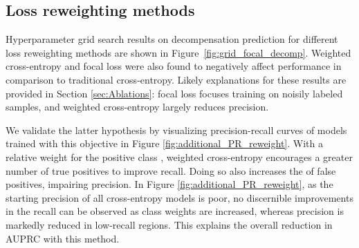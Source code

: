 \documentclass[nohyperref]{article}
\begin{document}
\begin{comment}
  \newpage
\begin{table}[t] \centering
    \caption{\textbf{Timestep-level performance with pivot bootstrap uncertainty estimation.} Recall is reported at a 50\% precision. Circulatory and respiratory failure are predicted on the HiB dataset, decompensation on M3B. In \textbf{bold}, we highlight best-performing methods).} \label{tab:perf_results-bs}
\resizebox{\textwidth}{!}{\begin{tabular}{lcccccc}
\toprule

 Task & \multicolumn{2}{c}{Circulatory Failure} & \multicolumn{2}{c}{Decompensation} & \multicolumn{2}{c}{Respiratory Failure} \\
 \cmidrule(lr){2-3} \cmidrule(lr){4-5}\cmidrule(lr){6-7}
Method &         AUPRC &   Recall &         AUPRC &   Recall &         AUPRC &   Recall\\
\midrule
Cross-entropy      &             39.3  0.1 &             29.4  0.1 &             34.6  0.1 &             28.2  0.1 &    0.0 &    0.0 \\
Multi-horizon \citep{tomavsev2019} &             39.8  0.1 &             30.4  0.1 &             35.0  0.1 &             28.6  0.1 &             60.2  0.0 &             76.7  0.0 \\
\textbf{Temporal Label Smoothing}     &    0.1 &    0.1 &    0.1 &    0.1 &             60.3  0.0 &             77.1  0.0 \\
\bottomrule
\end{tabular}}
\vspace{-0.5em}
\end{table}  
\end{comment}
\subsection{Loss reweighting methods}
\label{appendix:loss_reweight}

Hyperparameter grid search results on decompensation prediction for different loss reweighting methods are shown in Figure~\ref{fig:grid_focal_decomp}. Weighted cross-entropy and focal loss were also found to negatively affect performance in comparison to traditional cross-entropy. Likely explanations for these results are provided in Section \ref{sec:Ablations}: focal loss focuses training on noisily labeled samples, and weighted cross-entropy largely reduces precision.

We validate the latter hypothesis by visualizing precision-recall curves of models trained with this objective in Figure \ref{fig:additional_PR_reweight}. With a relative weight for the positive class , weighted cross-entropy encourages a greater number of true positives to improve recall. Doing so also increases the of false positives, impairing precision. In Figure \ref{fig:additional_PR_reweight}, as the starting precision of all cross-entropy models is poor, no discernible improvements in the recall can be observed as class weights are increased, whereas precision is markedly reduced in low-recall regions. This explains the overall reduction in AUPRC with this method.
\end{document}
